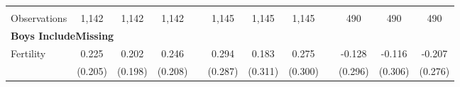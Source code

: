 \begin{landscape}
\begin{table}[htpb!]
\begin{center}
\begin{tabular}{lcccp{2mm}cccp{2mm}ccc}
\begin{footnotesize}\end{footnotesize}&\begin{footnotesize}\end{footnotesize}&\begin{footnotesize}\end{footnotesize}&\begin{footnotesize}\end{footnotesize}&\begin{footnotesize}\end{footnotesize}&\begin{footnotesize}\end{footnotesize}&\begin{footnotesize}\end{footnotesize}&\begin{footnotesize}\end{footnotesize}&\begin{footnotesize}\end{footnotesize}&\begin{footnotesize}\end{footnotesize}&\begin{footnotesize}\end{footnotesize}&\begin{footnotesize}\end{footnotesize}\\Observations&1,142&1,142&1,142&&1,145&1,145&1,145&&490&490&490\\
\multicolumn{12}{l}{\textbf{Boys IncludeMissing}}\\ 
Fertility&0.225&0.202&0.246&&0.294&0.183&0.275&&-0.128&-0.116&-0.207\\
&(0.205)&(0.198)&(0.208)&&(0.287)&(0.311)&(0.300)&&(0.296)&(0.306)&(0.276)\\

\end{tabular}
\end{center}
\end{table}
\end{landscape}

